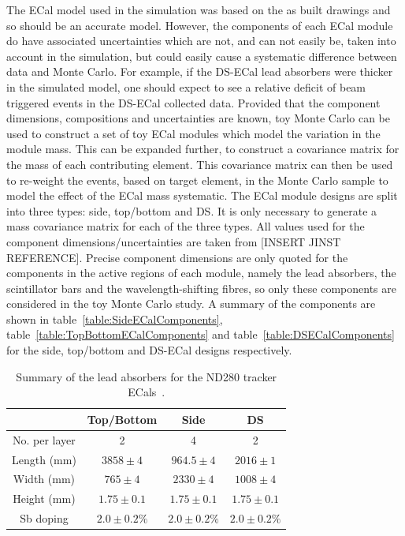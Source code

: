 The ECal model used in the simulation was based on the as built drawings and so should be an accurate model.  However, the components of each ECal module do have associated uncertainties which are not, and can not easily be, taken into account in the simulation, but could easily cause a systematic difference between data and Monte Carlo.  For example, if the DS-ECal lead absorbers were thicker in the simulated model, one should expect to see a relative deficit of beam triggered events in the DS-ECal collected data.  Provided that the component dimensions, compositions and uncertainties are known, toy Monte Carlo can be used to construct a set of toy ECal modules which model the variation in the module mass.  This can be expanded further, to construct a covariance matrix for the mass of each contributing element.  This covariance matrix can then be used to re-weight the events, based on target element, in the Monte Carlo sample to model the effect of the ECal mass systematic.  The ECal module designs are split into three types: side, top/bottom and DS.  It is only necessary to generate a mass covariance matrix for each of the three types.  All values used for the component dimensions/uncertainties are taken from [INSERT JINST REFERENCE].  Precise component dimensions are only quoted for the components in the active regions of each module, namely the lead absorbers, the scintillator bars and the wavelength-shifting fibres, so only these components are considered in the toy Monte Carlo study.  A summary of the components are shown in table~\ref{table:SideECalComponents}, table~\ref{table:TopBottomECalComponents} and table~\ref{table:DSECalComponents} for the side, top/bottom and DS-ECal designs respectively.
\begin{table}
  \begin{tabular}{ c c c c }
     & Top/Bottom & Side & DS \\ \hline \hline
  No. per layer & 2 & 4 & 2 \\
  Length (mm) & $3858\pm4$ & $964.5\pm4$ & $2016\pm1$ \\
  Width (mm) & $765\pm4$ & $2330\pm4$ & $1008\pm4$ \\
  Height (mm) & $1.75\pm0.1$ & $1.75\pm0.1$ & $1.75\pm0.1$ \\
  Sb doping & $2.0\pm0.2\%$ & $2.0\pm0.2\%$ & $2.0\pm0.2\%$ \\
  \end{tabular}
  \caption{Summary of the lead absorbers for the ND280 tracker ECals~\cite{1748-0221-8-10-P10019}.}
  \label{table:LeadAbsorberDimensions}
\end{table}

